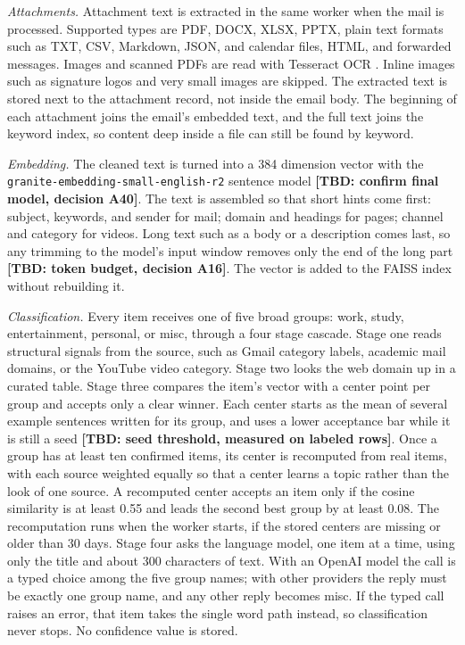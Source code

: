 \documentclass[conference]{IEEEtran}
\newcommand{\embmodel}{\texttt{granite\allowbreak-embedding\allowbreak-small\allowbreak-english\allowbreak-r2}}
\newcommand{\embdim}{384}
\newcommand{\tbd}[1]{\textbf{[TBD: #1]}}
\begin{document}
\textit{Attachments.} Attachment text is extracted in the same worker when the mail is processed. Supported types are PDF, DOCX, XLSX, PPTX, plain text formats such as TXT, CSV, Markdown, JSON, and calendar files, HTML, and forwarded messages. Images and scanned PDFs are read with Tesseract OCR \cite{b15}. Inline images such as signature logos and very small images are skipped. The extracted text is stored next to the attachment record, not inside the email body. The beginning of each attachment joins the email's embedded text, and the full text joins the keyword index, so content deep inside a file can still be found by keyword.

\textit{Embedding.} The cleaned text is turned into a \embdim{} dimension vector with the \embmodel{} sentence model \tbd{confirm final model, decision A40}. The text is assembled so that short hints come first: subject, keywords, and sender for mail; domain and headings for pages; channel and category for videos. Long text such as a body or a description comes last, so any trimming to the model's input window removes only the end of the long part \tbd{token budget, decision A16}. The vector is added to the FAISS index without rebuilding it.

\textit{Classification.} Every item receives one of five broad groups: work, study, entertainment, personal, or misc, through a four stage cascade. Stage one reads structural signals from the source, such as Gmail category labels, academic mail domains, or the YouTube video category. Stage two looks the web domain up in a curated table. Stage three compares the item's vector with a center point per group and accepts only a clear winner. Each center starts as the mean of several example sentences written for its group, and uses a lower acceptance bar while it is still a seed \tbd{seed threshold, measured on labeled rows}. Once a group has at least ten confirmed items, its center is recomputed from real items, with each source weighted equally so that a center learns a topic rather than the look of one source. A recomputed center accepts an item only if the cosine similarity is at least 0.55 and leads the second best group by at least 0.08. The recomputation runs when the worker starts, if the stored centers are missing or older than 30 days. Stage four asks the language model, one item at a time, using only the title and about 300 characters of text. With an OpenAI model the call is a typed choice among the five group names; with other providers the reply must be exactly one group name, and any other reply becomes misc. If the typed call raises an error, that item takes the single word path instead, so classification never stops. No confidence value is stored.
\end{document}
